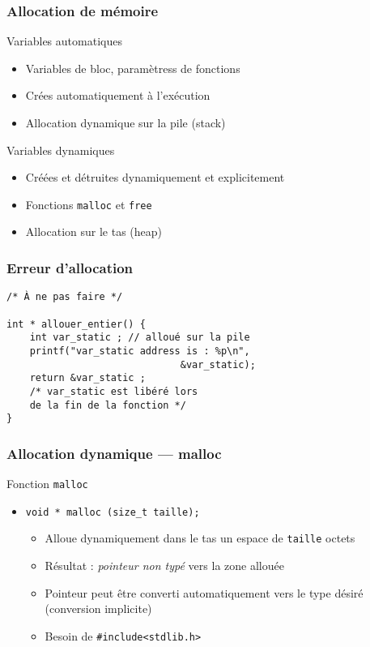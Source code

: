\documentclass[table,handout,tikz,12pt,svgnames]{beamer}
\subtitle{\Huge Allocation Dynamique}
\date{CM3}
\begin{document}
\begin{frame}
	\titlepage
\end{frame}

\begin{frame}[fragile=singleslide]
	\frametitle{Allocation de mémoire}
		\begin{block}{Variables automatiques} %
			\begin{itemize}
                \item Variables de bloc, paramètress de fonctions
			\item Crées automatiquement à l'exécution
            \item Allocation dynamique sur la pile (stack)
			\end{itemize}
		\end{block}
		\begin{block}{Variables dynamiques} %
			\begin{itemize}
			\item Créées et détruites dynamiquement et explicitement
			\item Fonctions \texttt{malloc} et \texttt{free}
			\item Allocation sur le tas (heap)
			\end{itemize}
		\end{block}
\end{frame}

\begin{frame}[fragile=singleslide]
	\frametitle{Erreur d'allocation }
\begin{verbatim}
/* À ne pas faire */	

int * allouer_entier() {
	int var_static ; // alloué sur la pile
	printf("var_static address is : %p\n",
							  &var_static);
	return &var_static ;
    /* var_static est libéré lors
    de la fin de la fonction */
}			
\end{verbatim}
\end{frame}

\begin{frame}[fragile=singleslide]
	\frametitle{Allocation dynamique --- malloc}
		\begin{block}{Fonction \texttt{malloc}} %
			\begin{itemize}
				\item \texttt{void * malloc (size\_t taille);}
				\begin{itemize}
					\item Alloue dynamiquement dans le tas un espace de \texttt{taille} octets
					\item Résultat : \textit{pointeur non typé} vers la zone allouée
					\item Pointeur peut être converti automatiquement vers le type désiré (conversion implicite)
					\item Besoin de \texttt{\#include<stdlib.h>}
				\end{itemize}
			\end{itemize}
		\end{block}
\end{frame}
\end{document}
